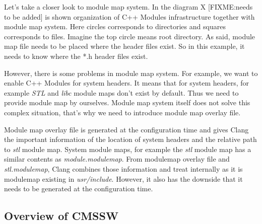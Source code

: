 \documentclass[12pt]{iopart}
\begin{document}





Let’s take a closer look to module map system. In the diagram X [FIXME:needs to be added] is shown organization of C++ Modules infrastructure together with module map system. Here circles corresponds to directories and squares corresponds to files. Imagine the top circle means root directory. As said, module map file needs to be placed where the header files exist. So in this example, it needs to know where the *.h header files exist.

However, there is some problems in module map system.  For example, we want to enable C++ Modules for system headers. It means that for system headers, for example \textit{STL} and \textit{libc} module maps don’t exist by default. Thus we need to provide module map by ourselves. Module map system itself does not solve this complex situation, that’s why we need to introduce module map overlay file.

Module map overlay file is generated at the configuration time and gives Clang the important information of the location of system headers and the relative path to \textit{stl} module map. System module maps, for example the \textit{stl} module map has a similar contents as \textit{module.modulemap}. From modulemap overlay file and \textit{stl.modulemap}, Clang combines those information and treat internally as it is modulemap existing in \textit{usr/include}. However, it also has the downside that it needs to be generated at the configuration time.


\subsection{Overview of CMSSW}
\label{cmssw}
\end{document}
